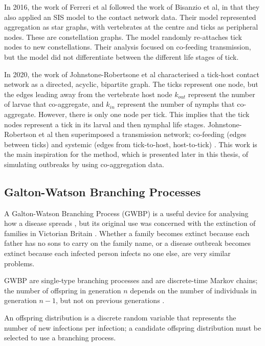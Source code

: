 \documentclass{article}
\begin{document}
In 2016, the work of Ferreri et al followed the work of Bisanzio et al, in that they also applied an SIS model to the contact network data. Their model represented aggregation as star graphs, with vertebrates at the centre and ticks as peripheral nodes. These are constellation graphs. The model randomly re-attaches tick nodes to new constellations. Their analysis focused on co-feeding transmission, but the model did not differentiate between the different life stages of tick.

In 2020, the work of Johnstone-Robertsone et al characterised a tick-host contact network as a directed, acyclic, bipartite graph. The ticks represent one node, but the edges leading away from the vertebrate host node $ k_{out} $ represent the number of larvae that co-aggregate, and $ k_{in} $ represent the number of nymphs that co-aggregate. However, there is only one node per tick. This implies that the tick nodes represent a tick in its larval and then nymphal life stages. Johnstone-Robertson et al then superimposed a transmission network; co-feeding (edges between ticks) and systemic (edges from tick-to-host, host-to-tick) \cite{JohnstoneRobertson2020}. This work is the main inspiration for the method, which is presented later in this thesis, of simulating outbreaks by using co-aggregation data.

\subsection{Galton-Watson Branching Processes}

A Galton-Watson Branching Process (GWBP) is a useful device for analysing how a disease spreads \cite{Diekman2000}, but its original use was concerned with the extinction of families in Victorian Britain \cite{Athreya1972}. Whether a family becomes extinct because each father has no sons to carry on the family name, or a disease outbreak becomes extinct because each infected person infects no one else, are very similar problems.

GWBP are single-type branching processes and are discrete-time Markov chains; the number of offspring in generation $ n $ depends on the number of individuals in generation $ n - 1 $, but not on previous generations \cite{Allen2019}.

An offspring distribution is a discrete random variable that represents the number of new infections per infection; a candidate offspring distribution must be selected to use a branching process.
\end{document}
